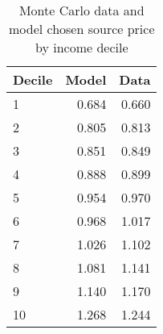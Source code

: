 \begin{table}[!ht]
	\centering
		\caption{Monte Carlo data and model chosen source price by income decile}
\begin{tabular}{lrr}
		\toprule
         Decile&     Model&      Data\\
		\midrule
		              1&     0.684&     0.660\\
		              2&     0.805&     0.813\\
		              3&     0.851&     0.849\\
		              4&     0.888&     0.899\\
		              5&     0.954&     0.970\\
		              6&     0.968&     1.017\\
		              7&     1.026&     1.102\\
		              8&     1.081&     1.141\\
		              9&     1.140&     1.170\\
		             10&     1.268&     1.244\\
		\bottomrule
	\end{tabular}
\end{table}
